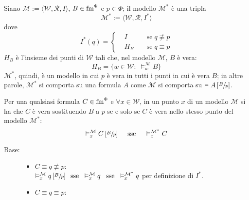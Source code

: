 \documentclass[a4paper,12pt]{article}
\newcommand{\latinmodern}[1]{\text{#1}}
\newcommand{\latinmath}[1]{\text{\latinmodern{#1}}} %
\begin{document}
\begin{description}
\begin{dimo}
		      \hypertarget{mod*}{}
		      \begin{defin}
			       Siano $\mathcal{M} := \langle \mathcal{W}, \mathcal{R}, I \rangle$, $B \in \latinmath{fm}^{\Phi}$ e $p \in \Phi$; il modello $\mathcal{M}^{\ast}$ è una tripla
			      $$\mathcal{M}^{\ast} := \langle \mathcal{W}, \mathcal{R}, I^{\ast} \rangle $$
			      dove
			      $$I^{\ast}(q) = \left\{
				      \begin{aligned}
					       & I \;   &  & \text{se} \; q \not\equiv p \\
					       & H_B \; &  & \text{se} \; q \equiv p
				      \end{aligned}
				      \right.$$
			      $H_B$ è l'insieme dei punti di $\mathcal{W}$ tali che, nel modello $\mathcal{M}$, $B$ è vera: $$H_B = \{w \in \mathcal{W} : \; \vDash_w^{\mathcal{M}} B\}$$
			      $\mathcal{M}^{\ast}$, quindi, è un modello in cui $p$ è vera in tutti i punti in cui è vera $B$; in altre parole, $\mathcal{M}^{\ast}$ si comporta su una formula $A$ come $\mathcal{M}$ si comporta su $\vDash A \left[\sfrac{B}{p}\right]$. \\
		      \end{defin}
		      \hypertarget{lemdif}{}
		      \begin{lem}
			       Per una qualsiasi formula $C \in \latinmath{fm}^{\Phi}$ e $\forall x \in \mathcal{W}$, in un punto $x$ di un modello $\mathcal{M}$ si ha che $C$ è vera sostituendo $B$ a $p$ se e solo se $C$ è vera nello stesso punto del modello $\mathcal{M}^{\ast}$:
			      $$\vDash_x^{\mathcal{M}} C \left[\sfrac{B}{p}\right] \quad\; \text{sse} \quad\; \vDash_x^{\mathcal{M^{\ast}}} C$$
		      \end{lem}
		      \begin{dimo}
			       \phantom{ciao}
			      \begin{description}
				      \item[Base:] \phantom{ciao}
				            \begin{itemize}
					            \item $C \equiv q \not\equiv p$: \\
					                  $\vDash_x^{\mathcal{M}} q \left[\sfrac{B}{p}\right] \;\; \text{sse} \;\; \vDash_x^{\mathcal{M}} q \;\; \; \text{sse}\;\; \vDash_x^{\mathcal{M^{\ast}}} q$ \quad per definizione di $I^{\ast}$.
					            \item $C \equiv q \equiv p$: \\

\end{itemize}
\end{description}
\end{dimo}
\end{dimo}
\end{description}
\end{document}
